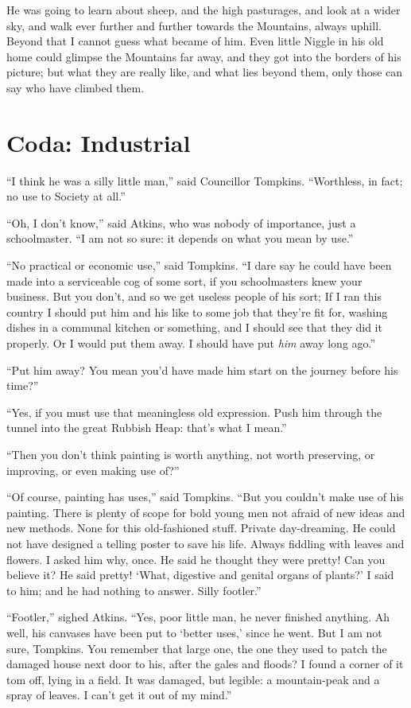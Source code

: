 \documentclass[english]{scrartcl}
\begin{document}
He was going to learn about sheep, and the high pasturages, and look at a wider sky, and walk ever further and further towards the Mountains, always uphill. Beyond that I cannot guess what became of him. Even little Niggle in his old home could glimpse the Mountains far away, and they got into the borders of his picture; but what they are really like, and what lies beyond them, only those can say who have climbed them.

\section*{Coda: Industrial}

“I think he was a silly little man,” said Councillor Tompkins. “Worthless, in fact; no use to Society at all.”

“Oh, I don’t know,” said Atkins, who was nobody of importance, just a schoolmaster. “I am not so sure: it depends on what you mean by use.”

“No practical or economic use,” said Tompkins. “I dare say he could have been made into a serviceable cog of some sort, if you schoolmasters knew your business. But you don’t, and so we get useless people of his sort; If I ran this country I should put him and his like to some job that they’re fit for, washing dishes in a communal kitchen or something, and I should see that they did it properly. Or I would put them away. I should have put \emph{him} away long ago.”

“Put him away? You mean you’d have made him start on the journey before his time?”

“Yes, if you must use that meaningless old expression. Push him through the tunnel into the great Rubbish Heap: that’s what I mean.”

“Then you don’t think painting is worth anything, not worth preserving, or improving, or even making use of?”

“Of course, painting has uses,” said Tompkins. “But you couldn’t make use of his painting. There is plenty of scope for bold young men not afraid of new ideas and new methods. None for this old-fashioned stuff. Private day-dreaming. He could not have designed a telling poster to save his life. Always fiddling with leaves and flowers. I asked him why, once. He said he thought they were pretty! Can you believe it? He said pretty! ‘What, digestive and genital organs of plants?’ I said to him; and he had nothing to answer. Silly footler.”

“Footler,” sighed Atkins. “Yes, poor little man, he never finished anything. Ah well, his canvases have been put to ‘better uses,’ since he went. But I am not sure, Tompkins. You remember that large one, the one they used to patch the damaged house next door to his, after the gales and floods? I found a corner of it tom off, lying in a field. It was damaged, but legible: a mountain-peak and a spray of leaves. I can’t get it out of my mind.”
\end{document}
